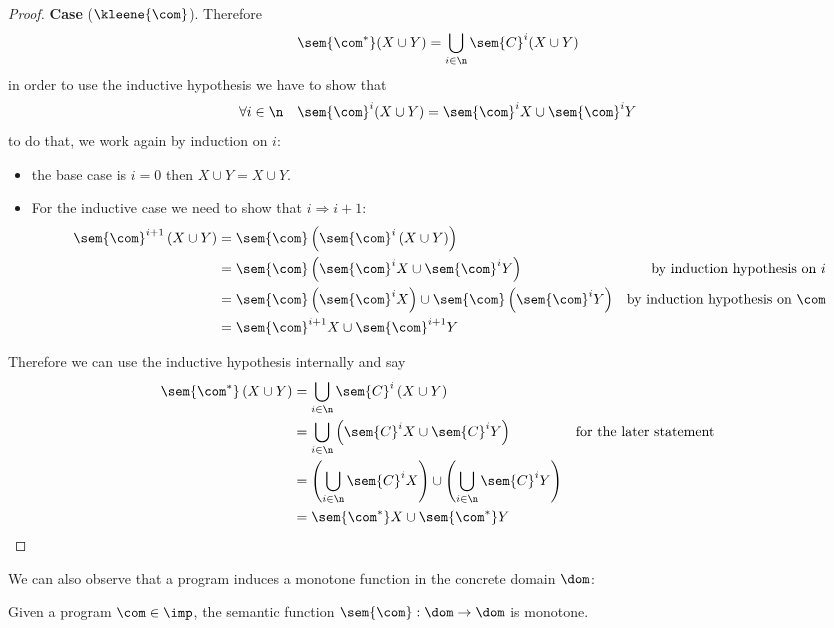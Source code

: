 \begin{proof}
  \medskip

  \noindent
  \textbf{Case} (\(\kleene{\com}\)). Therefore
  \[\sem{\com^*}(X\cup Y) = \bigcup_{i\in\n}\sem{C}^i(X\cup Y)\] in
  order to use the inductive hypothesis we have to show
  that
  \[\forall i \in \n \quad \sem{\com}^i(X \cup Y) = \sem{\com}^i X
    \cup \sem{\com}^i Y\] to do that, we work again by induction on
  \(i\):
  \begin{itemize}
  \item the base case is \(i = 0\) then \(X \cup Y = X \cup Y\).
  \item For the inductive case we need to show that
    \(i \Rightarrow i+1\):
    \begin{align*}
      \sem{\com}^{i+1}\left(X\cup Y\right) & = \sem{\com}\left(\sem{\com}^i \left(X \cup Y\right)\right) \\
                                           & = \sem{\com}\left(\sem{\com}^iX \cup \sem{\com}^iY\right) & \text{by induction hypothesis on } i \\
                                           & = \sem{\com}\left(\sem{\com}^iX\right) \cup \sem{\com}\left(\sem{\com}^iY\right) & \text{by induction hypothesis on } \com \\
                                           & = \sem{\com}^{i+1}X \cup \sem{\com}^{i+1}Y
    \end{align*}
  \end{itemize}
  Therefore we can use the inductive hypothesis internally and say
  \begin{align*}
    \sem{\com^*}\left(X\cup Y\right) & = \bigcup_{i\in\n}\sem{C}^i\left(X\cup Y\right) \\
                                     & = \bigcup_{i\in\n}\left(\sem{C}^iX \cup \sem{C}^iY\right) & \text{for the later statement} \\
                                     & = \left(\bigcup_{i\in\n}\sem{C}^iX\right) \cup \left(\bigcup_{i\in\n}\sem{C}^iY\right) \\
                                     & = \sem{\com^*}X \cup \sem{\com^*}Y \qedhere
  \end{align*}
\end{proof}

We can also observe that a program induces a monotone function in the
concrete domain \(\dom\):

\begin{lemma}
  Given a program \(\com\in\imp\), the semantic function
  \(\sem{\com} : \dom \to \dom\) is monotone.
\end{lemma}

